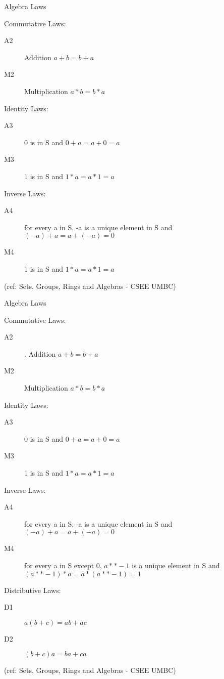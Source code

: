 \begin{frame}{Algebra Laws}

Commutative  Laws:
\begin{description}
\item[A2] Addition $a+b = b+a$
\item[M2] Multiplication $a*b = b*a$
\end{description}

Identity  Laws: 
\begin{description}
\item[A3] 0 is in S and  $0+a = a+0 = a $
\item[M3] 1 is in S and  $1*a = a*1 = a$
\end{description}
				
Inverse   Laws: 
\begin{description}
\item[A4] for every a in S, -a is a unique element in S and
                      $(-a)+a = a+(-a) = 0$
\item[M4] 1 is in S and  $1*a = a*1 = a$
\end{description}				
									
\tiny{(ref: Sets, Groups, Rings and Algebras - CSEE UMBC)}

\end{frame}

\begin{frame}{Algebra Laws}

Commutative  Laws:
\begin{description}
\item[A2]. Addition $a+b = b+a$
\item[M2] Multiplication $a*b = b*a$
\end{description}

Identity  Laws: 
\begin{description}
\item[A3] 0 is in S and  $0+a = a+0 = a $
\item[M3] 1 is in S and  $1*a = a*1 = a$
\end{description}
				
Inverse   Laws: 
\begin{description}
\item[A4]for every a in S, -a is a unique element in S and
                      $(-a)+a = a+(-a) = 0$
\item[M4] for every a in S except 0, $a**-1$ is a unique element in S
                      and $(a**-1)*a = a*(a**-1) = 1$
\end{description}				
									
Distributive    Laws: 
\begin{description}
\item[D1] $a(b+c) = ab + ac$
\item[D2] $(b+c)a = ba + ca$
\end{description}				
																		
\tiny{(ref: Sets, Groups, Rings and Algebras - CSEE UMBC)}

\end{frame}


